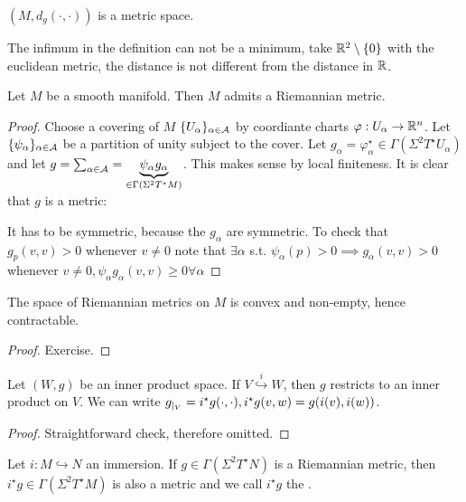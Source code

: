  \((M,d_g(\cdot,\cdot))\) is a metric space.

The infimum in the definition can not be a minimum, take \(\mathbb{R}^2\setminus \{0\}\) with the euclidean metric, the distance is not different from the distance in \(\mathbb{R}\).

\begin{lemma}\label{lem:9.2}
    Let \(M\) be a smooth manifold. Then \(M\) admits a Riemannian 
    metric.
\end{lemma}

\begin{proof}
    Choose a covering of \(M\) \(\{U_\alpha\}_{\alpha\in \mathcal{A}}\) by coordiante charts \(\varphi:U_\alpha\to \mathbb{R}^n\).
    Let \(\{\psi_\alpha\}_{\alpha\in \mathcal{A}}\) be a partition of unity subject to the cover.
    Let \(g_\alpha=\varphi_\alpha^\star\in\Gamma(\Sigma^2 T^\star U_\alpha)\) and let \(g=\sum_{\alpha\in\mathcal{A}}=\underbrace{\psi_\alpha g_\alpha}_{\in \Gamma(\Sigma^2T^\star M)}\).
    This makes sense by local finiteness. It is clear that \(g\) is a metric:

    It has to be symmetric, because the \(g_\alpha\) are symmetric. To check that \(g_p(v,v)> 0\)
    whenever \(v\neq 0\) note that \(\exists\alpha\) s.t. \(\psi_\alpha(p)>0\implies g_\alpha(v,v)>0\)
    whenever \(v\neq 0,\psi_\alpha g_\alpha(v,v)\geq 0\forall \alpha\)
\end{proof}

\begin{corollary}\label{lem:9.3}
    The space of Riemannian metrics on \(M\) is convex and non-empty, hence contractable.
\end{corollary}

\begin{proof}
    Exercise.
\end{proof}

\begin{lemma}\label{lem:9.4}
    Let \((W,g)\) be an inner product space. If \(V\stackrel{i}{\hookrightarrow} W\), then 
    \(g\) restricts to an inner product on \(V\). We can write \(g_{|_{V}}=i^\star g(\cdot,\cdot),i^\star g(v,w)=g(i(v),i(w))\).
\end{lemma}

\begin{proof}
    Straightforward check, therefore omitted.
\end{proof}

\begin{corollary}\label{cor:9.5}
    Let \(i:M\hookrightarrow N\) an immersion. If \(g\in \Gamma(\Sigma^2T^\star N)\) is a 
    Riemannian metric, then \(i^\star g\in \Gamma(\Sigma^2 T^\star M)\) is also a metric and we call 
    \(i^\star g\) the . 
\end{corollary}

